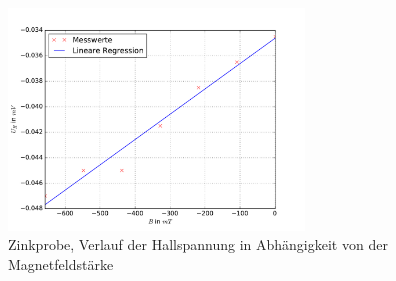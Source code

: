 \begin{figure}
  \centering
  \includegraphics[width=0.7\textwidth]{pics/u_h_zink_konstI.pdf}
  \caption{Zinkprobe, Verlauf der Hallspannung in Abhängigkeit von der Magnetfeldstärke}
  \label{fig: uh_konstI_zink}
\end{figure}


